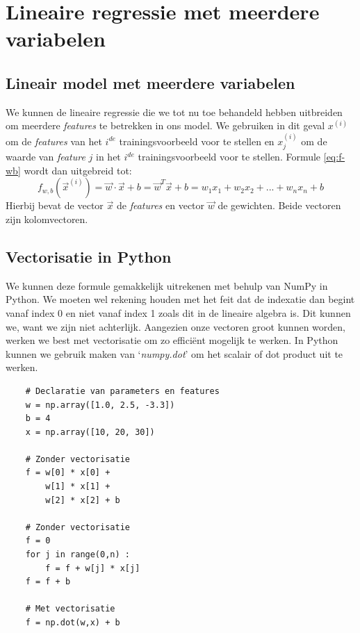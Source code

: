 \section{Lineaire regressie met meerdere variabelen}

\subsection{Lineair model met meerdere variabelen}
We kunnen de lineaire regressie die we tot nu toe behandeld hebben uitbreiden om meerdere \textit{features} te betrekken in ons model. We gebruiken in dit geval $x^{(i)}$ om de \textit{features} van het $i^{de}$ trainingsvoorbeeld voor te stellen en $x^{(i)}_{j}$ om de waarde van \textit{feature} $j$ in het $i^{de}$ trainingsvoorbeeld voor te stellen. Formule \ref{eq:f-wb} wordt dan uitgebreid tot:
\begin{equation}
	f_{w,b}(\vec{x}^{(i)}) = \vec{w} \cdot \vec{x} + b = \vec{w}^{T} \vec{x} + b = w_{1}x_{1} + w_{2}x_{2} + ... + w_{n}x_{n} + b
	\label{eq:f-wb-multi}
\end{equation}
\noindent
Hierbij bevat de vector $\vec{x}$ de \textit{features} en vector $\vec{w}$ de gewichten. Beide vectoren zijn kolomvectoren. 

\subsection{Vectorisatie in Python}

We kunnen deze formule gemakkelijk uitrekenen met behulp van NumPy in Python. We moeten wel rekening houden met het feit dat de indexatie dan begint vanaf index 0 en niet vanaf index 1 zoals dit in de lineaire algebra is. Dit kunnen we, want we zijn niet achterlijk. Aangezien onze vectoren groot kunnen worden, werken we best met vectorisatie om zo efficiënt mogelijk te werken. In Python kunnen we gebruik maken van `\textit{numpy.dot}' om het scalair of dot product uit te werken. \\

\begin{lstlisting}
	# Declaratie van parameters en features
	w = np.array([1.0, 2.5, -3.3])
	b = 4
	x = np.array([10, 20, 30])
	
	# Zonder vectorisatie
	f = w[0] * x[0] + 
	    w[1] * x[1] + 
	    w[2] * x[2] + b
	
	# Zonder vectorisatie
	f = 0
	for j in range(0,n) : 
	    f = f + w[j] * x[j]
	f = f + b
	
	# Met vectorisatie
	f = np.dot(w,x) + b
\end{lstlisting}

